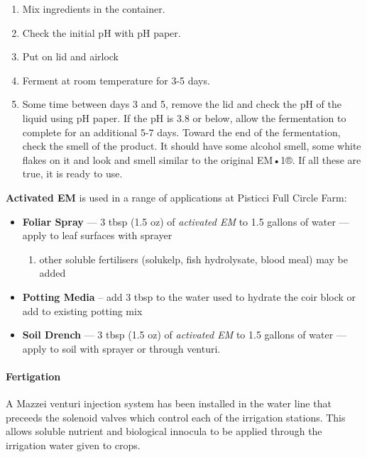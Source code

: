 \begin{enumerate}
\def\labelenumi{\arabic{enumi}.}
\itemsep1pt\parskip0pt
\item
  Mix ingredients in the container.
\item
  Check the initial pH with pH paper.
\item
  Put on lid and airlock
\item
  Ferment at room temperature for 3-5 days.
\item
  Some time between days 3 and 5, remove the lid and check the pH of the
  liquid using pH paper. If the pH is 3.8 or below, allow the
  fermentation to complete for an additional 5-7 days. Toward the end of
  the fermentation, check the smell of the product. It should have some
  alcohol smell, some white flakes on it and look and smell similar to
  the original EM•1®. If all these are true, it is ready to use.
\end{enumerate}

\textbf{Activated EM} is used in a range of applications at Pisticci
Full Circle Farm:

\begin{itemize}
\itemsep1pt\parskip0pt
\item
  \textbf{Foliar Spray} --- 3 tbsp (1.5 oz) of \emph{activated EM} to
  1.5 gallons of water --- apply to leaf surfaces with sprayer

  \begin{enumerate}
  \def\labelenumi{\arabic{enumi}.}
  \itemsep1pt\parskip0pt
  \item
    other soluble fertilisers (solukelp, fish hydrolysate, blood meal)
    may be added
  \end{enumerate}
\item
  \textbf{Potting Media} -- add 3 tbsp to the water used to hydrate the
  coir block or add to existing potting mix
\item
  \textbf{Soil Drench} --- 3 tbsp (1.5 oz) of \emph{activated EM} to 1.5
  gallons of water --- apply to soil with sprayer or through venturi.
\end{itemize}

\paragraph{Fertigation}\label{fertigation}

A Mazzei venturi injection system has been installed in the water line
that preceeds the solenoid valves which control each of the irrigation
stations. This allows soluble nutrient and biological innocula to be
applied through the irrigation water given to crops.

